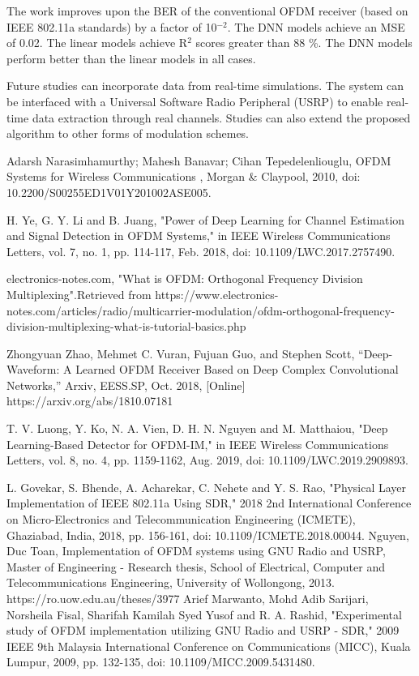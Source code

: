 \documentclass[conference]{IEEEtran}
\begin{document}
The work improves upon the BER of the conventional OFDM receiver (based on IEEE 802.11a standards) by a factor of 10$^{-2}$. The DNN models achieve an MSE of 0.02. The linear models achieve R$^{2}$ scores greater than 88 \%. The DNN models perform better than the linear models in all cases.

Future studies can incorporate data from real-time simulations. The system can be interfaced with a Universal Software Radio Peripheral (USRP) to enable real-time data extraction through real channels. Studies can also extend the proposed algorithm to other forms of modulation schemes.





\begin{thebibliography}{00}

Adarsh Narasimhamurthy; Mahesh Banavar; Cihan Tepedelenliouglu, OFDM Systems for Wireless Communications , Morgan \& Claypool, 2010, doi: 10.2200/S00255ED1V01Y201002ASE005.

H. Ye, G. Y. Li and B. Juang, "Power of Deep Learning for Channel Estimation and Signal Detection in OFDM Systems," in IEEE Wireless Communications Letters, vol. 7, no. 1, pp. 114-117, Feb. 2018, doi: 10.1109/LWC.2017.2757490.

electronics-notes.com, "What is OFDM: Orthogonal Frequency Division Multiplexing".Retrieved from https://www.electronics-notes.com/articles/radio/multicarrier-modulation/ofdm-orthogonal-frequency-division-multiplexing-what-is-tutorial-basics.php

 Zhongyuan Zhao, Mehmet C. Vuran, Fujuan Guo, and Stephen Scott, “Deep-Waveform: A Learned OFDM Receiver Based on Deep Complex Convolutional Networks,” Arxiv, EESS.SP, Oct. 2018, [Online] https://arxiv.org/abs/1810.07181

T. V. Luong, Y. Ko, N. A. Vien, D. H. N. Nguyen and M. Matthaiou, "Deep Learning-Based Detector for OFDM-IM," in IEEE Wireless Communications Letters, vol. 8, no. 4, pp. 1159-1162, Aug. 2019, doi: 10.1109/LWC.2019.2909893.

L. Govekar, S. Bhende, A. Acharekar, C. Nehete and Y. S. Rao, "Physical Layer Implementation of IEEE 802.11a Using SDR," 2018 2nd International Conference on Micro-Electronics and Telecommunication Engineering (ICMETE), Ghaziabad, India, 2018, pp. 156-161, doi: 10.1109/ICMETE.2018.00044.
 Nguyen, Duc Toan, Implementation of OFDM systems using GNU Radio and USRP, Master of Engineering - Research thesis, School of Electrical, Computer and Telecommunications Engineering, University of Wollongong, 2013. https://ro.uow.edu.au/theses/3977
 Arief Marwanto, Mohd Adib Sarijari, Norsheila Fisal, Sharifah Kamilah Syed Yusof and R. A. Rashid, "Experimental study of OFDM implementation utilizing GNU Radio and USRP - SDR," 2009 IEEE 9th Malaysia International Conference on Communications (MICC), Kuala Lumpur, 2009, pp. 132-135, doi: 10.1109/MICC.2009.5431480.


\end{thebibliography}
\end{document}

